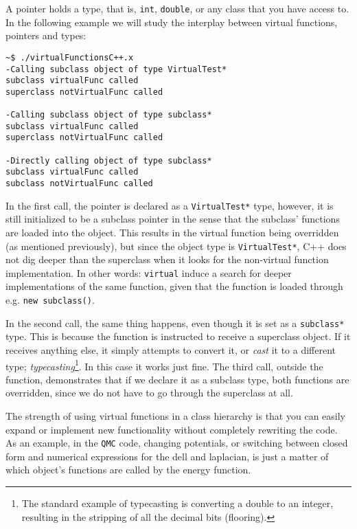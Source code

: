A pointer holds a type, that is, \verb+int+, \verb+double+, or any class that you have access to. In the following example we will study the interplay between virtual functions, pointers and types:

\vspace{0.5 cm}


\begin{verbatim}
~$ ./virtualFunctionsC++.x 
-Calling subclass object of type VirtualTest*
subclass virtualFunc called
superclass notVirtualFunc called

-Calling subclass object of type subclass*
subclass virtualFunc called
superclass notVirtualFunc called

-Directly calling object of type subclass*
subclass virtualFunc called
subclass notVirtualFunc called
\end{verbatim}

In the first call, the pointer is declared as a \verb+VirtualTest*+ type, however, it is still initialized to be a subclass pointer in the sense that the subclass' functions are loaded into the object. This results in the virtual function being overridden (as mentioned previously), but since the object type is \verb+VirtualTest*+, C++ does not dig deeper than the superclass when it looks for the non-virtual function implementation. In other words: \verb+virtual+ induce a search for deeper implementations of the same function, given that the function is loaded through e.g. \verb+new subclass()+. 

In the second call, the same thing happens, even though it is set as a \verb+subclass*+ type. This is because the function is instructed to receive a superclass object. If it receives anything else, it simply attempts to convert it, or \textit{cast} it to a different type; \textit{typecasting}\footnote{The standard example of typecasting is converting a double to an integer, resulting in the stripping of all the decimal bits (flooring).}. In this case it works just fine. The third call, outside the function, demonstrates that if we declare it as a subclass type, both functions are overridden, since we do not have to go through the superclass at all.

The strength of using virtual functions in a class hierarchy is that you can easily expand or implement new functionality without completely rewriting the code. As an example, in the \verb+QMC+ code, changing potentials, or switching between closed form and numerical expressions for the dell and laplacian, is just a matter of which object's functions are called by the energy function.

